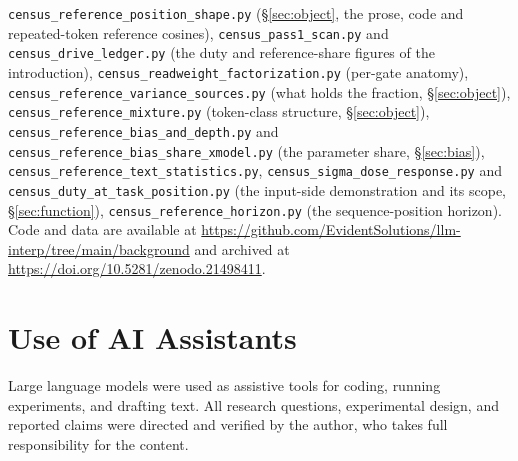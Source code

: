 \documentclass[11pt]{article}
\begin{document}
{\texttt{census\_reference\_position\_shape.py} (\S\ref{sec:object}, the
prose, code and repeated-token reference cosines),
\texttt{census\_pass1\_scan.py} and \texttt{census\_drive\_ledger.py}
(the duty and reference-share figures of the introduction),
\texttt{census\_readweight\_factorization.py} (per-gate anatomy),
\texttt{census\_reference\_variance\_sources.py} (what holds the
fraction, \S\ref{sec:object}), \texttt{census\_reference\_mixture.py}
(token-class structure, \S\ref{sec:object}),
\texttt{census\_reference\_bias\_and\_depth.py} and
\texttt{census\_reference\_bias\_share\_xmodel.py} (the parameter share,
\S\ref{sec:bias}),
\texttt{census\_reference\_text\_statistics.py},
\texttt{census\_sigma\_dose\_response.py} and
\texttt{census\_duty\_at\_task\_position.py} (the input-side
demonstration and its scope, \S\ref{sec:function}),
\texttt{census\_reference\_horizon.py} (the sequence-position horizon).
Code and
data are available at
\url{https://github.com/EvidentSolutions/llm-interp/tree/main/background}
and archived at \url{https://doi.org/10.5281/zenodo.21498411}.
\par}

\section*{Use of AI Assistants}

Large language models were used as assistive tools for coding,
running experiments, and drafting text. All research questions,
experimental design, and reported claims were directed and verified by
the author, who takes full responsibility for the content.



\end{document}
